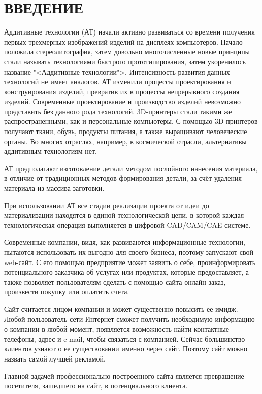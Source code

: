 \section*{ВВЕДЕНИЕ}

Аддитивные технологии (АТ) начали активно развиваться со времени получения первых трехмерных изображений изделий на дисплеях компьютеров. Начало положила стереолитография, затем довольно многочисленные новые принципы стали называть технологиями быстрого прототипирования, затем укоренилось название "<Аддитивные технологии">. Интенсивность развития данных технологий не имеет аналогов. АТ изменили процессы проектирования и конструирования изделий, превратив их в процессы непрерывного создания изделий. Современные проектирование и производство изделий невозможно представить без данного рода технологий. 3D-принтеры стали такими же распространенными, как и персональные компьютеры. С помощью 3D-принтеров получают ткани, обувь, продукты питания, а также выращивают человеческие органы. Во многих отраслях, например, в космической отрасли, альтернативы аддитивным технологиям нет.

АТ предполагают изготовление детали методом послойного нанесения материала, в отличие от традиционных методов формирования детали, за счёт удаления материала из массива заготовки.

При использовании АТ все стадии реализации проекта от идеи до материализации находятся в единой технологической цепи, в которой каждая технологическая операция выполняется в цифровой CAD/CAM/CAE-системе.

Современные компании, видя, как развиваются информационные технологии, пытаются использовать их выгодно для своего бизнеса, поэтому запускают свой web-сайт. С его помощью предприятие может заявить о себе, проинформировать потенциального заказчика об услугах или продуктах, которые предоставляет, а также позволяет пользователям сделать с помощью сайта онлайн-заказ, произвести покупку или оплатить счета.

Сайт считается лицом компании и может существенно повысить ее имидж. Любой пользователь сети Интернет сможет получить необходимую информацию о компании в любой момент, появляется возможность найти контактные телефоны, адрес и e-mail, чтобы связаться с компанией. Сейчас большинство клиентов узнают о ее существовании именно через сайт. Поэтому сайт можно назвать самой лучшей рекламой. 

Главной задачей профессионально построенного сайта является превращение посетителя, зашедшего на сайт, в потенциального клиента.

